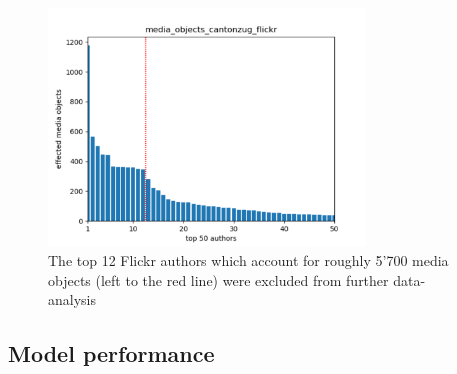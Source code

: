 \begin{figure}[ht]
   \centering
   \includegraphics[width=0.75\textwidth]{img/cantonzug_flickr_top50_w_line}
   \caption{The top 12 Flickr authors which account for roughly 5'700 media objects (left to the red line) were excluded from further data-analysis}
   \label{img:dominant_users_flickr}
\end{figure}



\subsection{Model performance}

